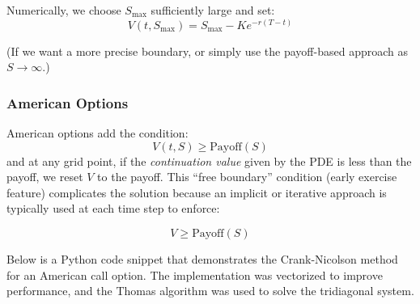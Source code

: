         Numerically, we choose $S_{\text{max}}$ sufficiently large and set:
        \begin{equation}
            V(t, S_{\text{max}}) = S_{\text{max}} - Ke^{-r(T-t)}
            \label{eq:boundary_smax}
        \end{equation}

        (If we want a more precise boundary, or simply use the payoff-based approach as $S \to \infty$.)

    \subsubsection{American Options}
        American options add the condition:
        \begin{equation}
            V(t, S) \geq \text{Payoff}(S)
            \label{eq:american_option_condition}
        \end{equation}
        and at any grid point, if the \textit{continuation value} given by the PDE is less than the payoff,
        we reset $V$ to the payoff. This ``free boundary'' condition (early exercise feature) complicates the solution
        because an implicit or iterative approach is typically used at each time step to enforce:

        \begin{equation*}
            V \geq \text{Payoff}(S)
        \end{equation*}

    Below is a Python code snippet that demonstrates the Crank-Nicolson method for an American call option.
    The implementation was vectorized to improve performance, and the Thomas algorithm was used to solve the tridiagonal system.

